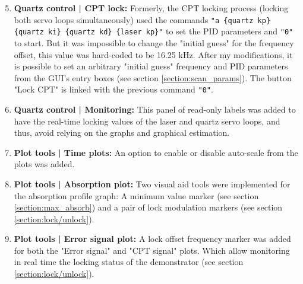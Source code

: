 \documentclass[a4paper,12pt]{article}
\begin{document}
\begin{enumerate}[wide, labelwidth=!, labelindent=0pt]
    \setcounter{enumi}{4} %
    \item \textbf{Quartz control | CPT lock:} \newline Formerly, the CPT locking process (locking both servo loops simultaneously) used the commands \mbox{\texttt{"a \{quartz kp\} \{quartz ki\} \{quartz kd\} \{laser kp\}"}} to set the PID parameters and \texttt{"0"} to start. But it was impossible to change the "initial guess" for the frequency offset, this value was hard-coded to be 16.25 kHz.
    \vfill
    After my modifications, it is possible to set an arbitrary "initial guess" frequency and PID parameters from the GUI's entry boxes (see section \ref{section:scan_params}).
    \newline The button "Lock CPT" is linked with the previous command \texttt{"0"}.
    \item \textbf{Quartz control | Monitoring:} \newline This panel of read-only labels was added to have the real-time locking values of the laser and quartz servo loops, and thus, avoid relying on the graphs and graphical estimation.
	\item \textbf{Plot tools | Time plots:} \newline An option to enable or disable auto-scale from the plots was added. 
	\item \textbf{Plot tools | Absorption plot:} \newline  Two visual aid tools were implemented for the absorption profile graph: A minimum value marker (see section \ref{section:max_absorb}) and a pair of lock modulation markers (see section \ref{section:lock/unlock}).

	\item \textbf{Plot tools | Error signal plot:} \newline A lock offset frequency marker was added for both the "Error signal" and "CPT signal" plots. Which allow monitoring in real time the locking status of the demonstrator (see section \ref{section:lock/unlock}).
	
\end{enumerate}
\end{document}
